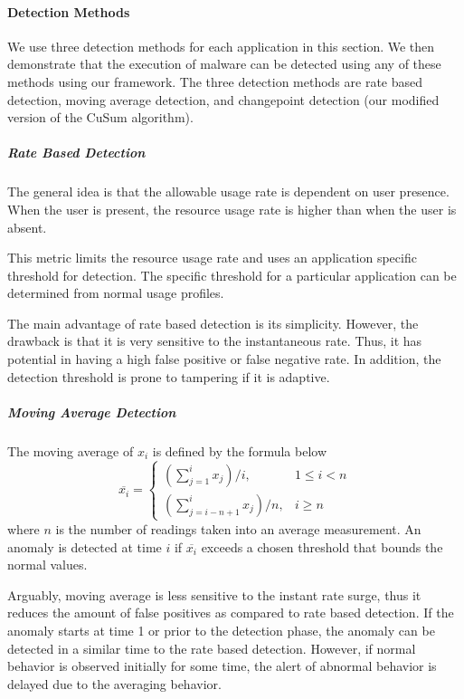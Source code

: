 \paragraph{Detection Methods}

We use three detection methods for each application in this section.  We then
demonstrate that the execution of malware can be detected using any of these
methods using our framework.  The three detection methods are rate based
detection, moving average detection, and changepoint detection (our modified
version of the CuSum algorithm).

\subparagraph{Rate Based Detection}

The general idea is that the allowable usage rate is dependent on user presence.
When the user is present, the resource usage rate is higher than 
when the user is absent.

This metric limits the resource usage rate 
and uses an application specific threshold for detection.
The specific threshold for a particular application 
can be determined from normal usage profiles.

The main advantage of rate based detection is its simplicity. 
However, the drawback is that it is very sensitive to the instantaneous rate. 
Thus, it has potential in having a high false positive or false negative rate. 
In addition, the detection threshold is prone to tampering if it is adaptive.

\subparagraph{Moving Average Detection}

The moving average of $x_i$ is defined by the formula below
\begin{equation}\label{movAvg}
    \overline{x_i} = \left\{ \begin{array}{lr}
        (\sum_{j=1}^{i}{x_j})/i, & 1 \leq i < n \\
        (\sum_{j=i-n+1}^{i}{x_j})/n, & i \geq n
    \end{array} \right.
\end{equation}
where $n$ is the number of readings taken into an average measurement. An
anomaly is detected at time $i$ if $\overline{x_i}$ exceeds a chosen threshold
that bounds the normal values.

Arguably, moving average is less sensitive to the instant rate surge, thus it
reduces the amount of false positives as compared to rate based detection. If
the anomaly starts at time 1 or prior to the detection phase, the anomaly can
be detected in a similar time to the rate based detection. However, if normal
behavior is observed initially for some time, the alert of abnormal behavior is
delayed due to the averaging behavior.

